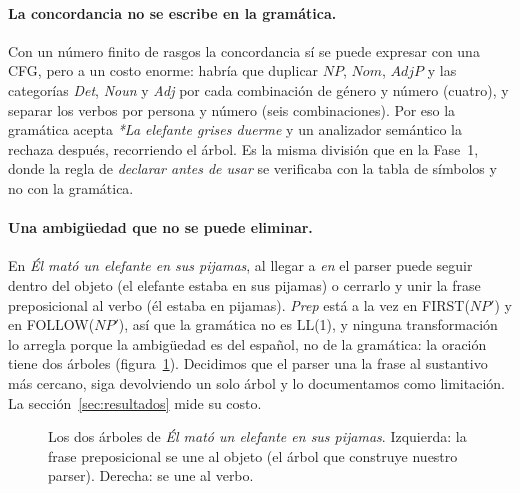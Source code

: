 \paragraph{La concordancia no se escribe en la gramática.} Con un número finito de rasgos la
concordancia sí se puede expresar con una CFG, pero a un costo enorme: habría que duplicar $NP$,
$Nom$, $AdjP$ y las categorías \textit{Det}, \textit{Noun} y \textit{Adj} por cada combinación de
género y número (cuatro), y separar los verbos por persona y número (seis combinaciones). Por eso
la gramática acepta \emph{*La elefante grises duerme} y un analizador semántico la rechaza
después, recorriendo el árbol. Es la misma división que en la Fase~1, donde la regla de
\emph{declarar antes de usar} se verificaba con la tabla de símbolos y no con la gramática.

\paragraph{Una ambigüedad que no se puede eliminar.} En \emph{Él mató un elefante en sus
pijamas}, al llegar a \emph{en} el parser puede seguir dentro del objeto (el elefante estaba en
sus pijamas) o cerrarlo y unir la frase preposicional al verbo (él estaba en pijamas).
\textit{Prep} está a la vez en FIRST($NP'$) y en FOLLOW($NP'$), así que la gramática no es
LL(1), y ninguna transformación lo arregla porque la ambigüedad es del español, no de la
gramática: la oración tiene dos árboles (figura~\ref{fig:arboles_pijamas}). Decidimos que el
parser una la frase al sustantivo más cercano, siga devolviendo un solo árbol y lo documentamos
como limitación. La sección~\ref{sec:resultados} mide su costo.

\begin{figure}[h]
  \centering
  \hfill
  \caption{Los dos árboles de \emph{Él mató un elefante en sus pijamas}. Izquierda: la frase
    preposicional se une al objeto (el árbol que construye nuestro parser). Derecha: se une al
    verbo.}
  \label{fig:arboles_pijamas}
\end{figure}

